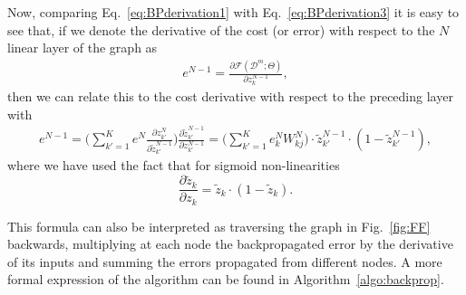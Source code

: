 %
Now, comparing Eq.~\ref{eq:BPderivation1} with Eq.~\ref{eq:BPderivation3} it is easy to see that, if we denote the derivative of the cost (or error) with respect to the $N$ linear layer of the graph as
%
\begin{align}
e^{N-1} = \frac{\partial \mathcal{F}(\mathcal{D}^m;\Theta)}{\partial z_{k}^{N-1}} ,
\label{eq:BPderivation4}
\end{align}
%
\noindent then we can relate this to the cost derivative with respect to the preceding layer with
%
\begin{align}
e^{N-1} = \bigg(\sum_{k'=1}^{K} e^N \frac{\partial z_{k'}^{N}}{\partial \tilde{z}_{k'}^{N-1}}\bigg)\frac{\partial \tilde{z}_{k'}^{N-1}}{\partial z_{k'}^{N-1}} = \bigg(\sum_{k'=1}^{K} e^N_k W^N_{kj}\bigg)\cdot\tilde{z}_{k'}^{N-1}\cdot(1-\tilde{z}_{k'}^{N-1}),
\end{align}
%
where we have used the fact that for sigmoid non-linearities 
%
\begin{equation}
\frac{\partial \tilde{z}_{k}}{\partial z_{k}} = \tilde{z}_{k}\cdot (1-\tilde{z}_{k}).
\end{equation}

This formula can also be interpreted as traversing the graph in Fig.~\ref{fig:FF} backwards, multiplying at each node the backpropagated error by the derivative of its inputs and summing the errors propagated from different nodes. A more formal expression of the algorithm can be found in Algorithm~\ref{algo:backprop}.

